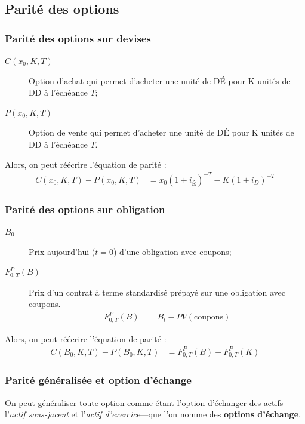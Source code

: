 \documentclass[10pt, french]{article}
\begin{document}
\begin{multicols*}{2}

\subsection*{Parité des options}

\subsubsection*{Parité des options sur devises}
\begin{description}
	\item[$C(x_0, K, T)$]	Option d'achat qui permet d'acheter une unité de DÉ pour K unités de DD à l'échéance $T$;
	\item[$P(x_0, K, T)$] 	Option de vente qui permet d'acheter une unité de DÉ pour K unités de DD à l'échéance $T$.
\end{description}

Alors, on peut réécrire l'équation de parité : 
\begin{align*}
	C(x_0, K,T) - P(x_0, K, T) 
	&= 	x_0 (1 + i_{\text{É}})^{-T} - K(1 + i_D)^{-T}
\end{align*}

\subsubsection*{Parité des options sur obligation}
\begin{description}
	\item[$B_{0}$]	Prix aujourd'hui ($t = 0$) d'une obligation avec coupons;
	\item[$F_{0, T}^{P}(B)$]	Prix d'un contrat à terme standardisé prépayé sur une obligation avec coupons.
		\setlength{\mathindent}{-1cm}
		\begin{align*}
		F_{0, T}^{P}(B) 
		&=	B_{t} - PV(\text{coupons})
		\end{align*}
		\setlength{\mathindent}{1cm}
\end{description}

Alors, on peut réécrire l'équation de parité : 
\begin{align*}
	C(B_{0}, K, T) - P(B_{0}, K, T) 
	&= 	F_{0, T}^{P}(B) - F_{0, T}^{P}(K)
\end{align*}

\subsubsection*{Parité généralisée et option d'échange}
On peut généraliser toute option comme étant l'option d'échanger des actifs---l'\textit{actif sous-jacent} et l'\textit{actif d'exercice}---que l'on nomme des \textbf{options d'échange}.\\


\end{multicols*}
\end{document}
